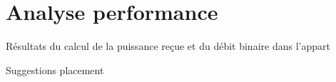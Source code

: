 \chapter{Analyse performance}
\label{chaper-4}

Résultats du calcul de la puissance reçue et du débit binaire dans l'appart

Suggestions placement
